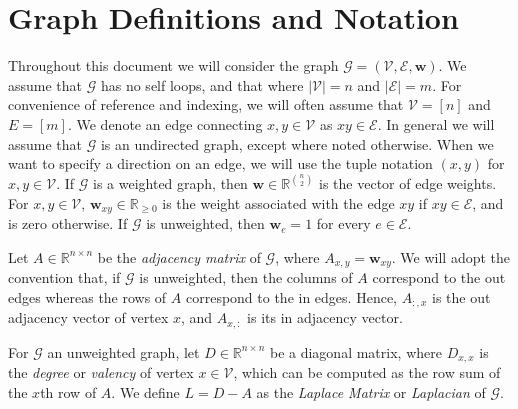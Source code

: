 \documentclass[10]{report}
\begin{document}
\section{Graph Definitions and Notation} \label{background:sec:graphdef}

Throughout this document we will consider the graph $\mathcal{G} = (\mathcal{V}, \mathcal{E}, \mathbf{w})$.
We assume that $\mathcal{G}$ has no self loops, and that where $|\mathcal{V}| = n$ and $|\mathcal{E}| = m$.
For convenience of reference and indexing, we will often assume that $\mathcal{V} = [n]$ and $E = [m]$. 
We denote an edge connecting $x, y \in \mathcal{V}$ as $xy \in \mathcal{E}$. 
In general we will assume that $\mathcal{G}$ is an  undirected graph, except where noted otherwise. 
When we want to specify a direction on an edge, we will use the tuple notation $(x, y)$ for $x, y \in \mathcal{V}$.
If $\mathcal{G}$ is a weighted graph, then $\mathbf{w} \in \mathbb{R}^{{n \choose 2}}$ is the vector of edge weights. 
For $x, y \in \mathcal{V}$, $\mathbf{w}_{xy} \in \mathbb{R}_{\geq 0}$ is the weight associated with the edge $xy$ if $xy \in \mathcal{E}$, and is zero otherwise.
If $\mathcal{G}$ is unweighted, then $\mathbf{w}_e = 1$ for every $e \in \mathcal{E}$. 

Let $A \in \mathbb{R}^{n\times n}$ be the \emph{adjacency matrix} of $\mathcal{G}$, where $A_{x,y} = \mathbf{w}_{xy}$.
We will adopt the convention that, if $\mathcal{G}$ is unweighted, then the columns of $A$ correspond to the out edges whereas the rows of $A$ correspond to the in edges. 
Hence, $A_{:,x}$ is the out adjacency vector of vertex $x$, and $A_{x,:}$ is its in adjacency vector.

For $\mathcal{G}$ an unweighted graph, let $D \in \mathbb{R}^{n\times n}$ be a diagonal matrix, where $D_{x,x}$ is the \emph{degree} or \emph{valency} of vertex $x \in \mathcal{V}$, which can be computed as the row sum of the $x$th row of $A$. 
We define $L = D - A$ as the \emph{Laplace Matrix} or \emph{Laplacian} of $\mathcal{G}$.
\end{document}
